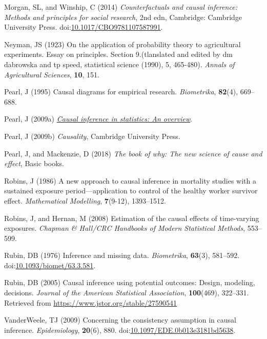 \documentclass[
  singlecolumn]{article}
\newlength{\cslhangindent}
\newenvironment{CSLReferences}[2] %
 {\begin{list}{}{%
  \setlength{\itemindent}{0pt}
  \setlength{\leftmargin}{0pt}
  \setlength{\parsep}{0pt}
  \ifodd #1
   \setlength{\leftmargin}{\cslhangindent}
   \setlength{\itemindent}{-1\cslhangindent}
  \fi
  \setlength{\itemsep}{#2\baselineskip}}}
 {\end{list}}
\begin{document}
\begin{CSLReferences}{1}{0}
Morgan, SL, and Winship, C (2014) \emph{Counterfactuals and causal
inference: Methods and principles for social research}, 2nd edn,
Cambridge: Cambridge University Press.
doi:\href{https://doi.org/10.1017/CBO9781107587991}{10.1017/CBO9781107587991}.

Neyman, JS (1923) On the application of probability theory to
agricultural experiments. Essay on principles. Section 9.(tlanslated and
edited by dm dabrowska and tp speed, statistical science (1990), 5,
465-480). \emph{Annals of Agricultural Sciences}, \textbf{10}, 151.

Pearl, J (1995) Causal diagrams for empirical research.
\emph{Biometrika}, \textbf{82}(4), 669--688.

Pearl, J (2009a) \emph{\href{https://doi.org/10.1214/09-SS057}{Causal
inference in statistics: An overview}}.

Pearl, J (2009b) \emph{Causality}, Cambridge University Press.

Pearl, J, and Mackenzie, D (2018) \emph{The book of why: The new science
of cause and effect}, Basic books.

Robins, J (1986) A new approach to causal inference in mortality studies
with a sustained exposure period---application to control of the healthy
worker survivor effect. \emph{Mathematical Modelling}, \textbf{7}(9-12),
1393--1512.

Robins, J, and Hernan, M (2008) Estimation of the causal effects of
time-varying exposures. \emph{Chapman \& Hall/CRC Handbooks of Modern
Statistical Methods}, 553--599.

Rubin, DB (1976) Inference and missing data. \emph{Biometrika},
\textbf{63}(3), 581--592.
doi:\href{https://doi.org/10.1093/biomet/63.3.581}{10.1093/biomet/63.3.581}.

Rubin, DB (2005) Causal inference using potential outcomes: Design,
modeling, decisions. \emph{Journal of the American Statistical
Association}, \textbf{100}(469), 322--331. Retrieved from
\url{https://www.jstor.org/stable/27590541}

VanderWeele, TJ (2009) Concerning the consistency assumption in causal
inference. \emph{Epidemiology}, \textbf{20}(6), 880.
doi:\href{https://doi.org/10.1097/EDE.0b013e3181bd5638}{10.1097/EDE.0b013e3181bd5638}.


\end{CSLReferences}
\end{document}
